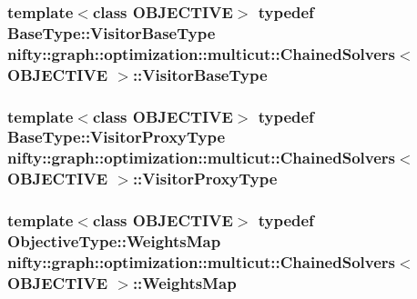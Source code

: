 \subsubsection[{Visitor\+Base\+Type}]{\setlength{\rightskip}{0pt plus 5cm}template$<$class O\+B\+J\+E\+C\+T\+I\+V\+E$>$ typedef {\bf Base\+Type\+::\+Visitor\+Base\+Type} {\bf nifty\+::graph\+::optimization\+::multicut\+::\+Chained\+Solvers}$<$ O\+B\+J\+E\+C\+T\+I\+V\+E $>$\+::{\bf Visitor\+Base\+Type}}\label{classnifty_1_1graph_1_1optimization_1_1multicut_1_1ChainedSolvers_a73196408ad592adcb3e3a89fef73fb69}
\hypertarget{classnifty_1_1graph_1_1optimization_1_1multicut_1_1ChainedSolvers_abdaad4f08d245de900243682dd917596}{}
\subsubsection[{Visitor\+Proxy\+Type}]{\setlength{\rightskip}{0pt plus 5cm}template$<$class O\+B\+J\+E\+C\+T\+I\+V\+E$>$ typedef {\bf Base\+Type\+::\+Visitor\+Proxy\+Type} {\bf nifty\+::graph\+::optimization\+::multicut\+::\+Chained\+Solvers}$<$ O\+B\+J\+E\+C\+T\+I\+V\+E $>$\+::{\bf Visitor\+Proxy\+Type}}\label{classnifty_1_1graph_1_1optimization_1_1multicut_1_1ChainedSolvers_abdaad4f08d245de900243682dd917596}
\hypertarget{classnifty_1_1graph_1_1optimization_1_1multicut_1_1ChainedSolvers_a8eefc287a6a2bea7421b42447f1a1fdf}{}
\subsubsection[{Weights\+Map}]{\setlength{\rightskip}{0pt plus 5cm}template$<$class O\+B\+J\+E\+C\+T\+I\+V\+E$>$ typedef Objective\+Type\+::\+Weights\+Map {\bf nifty\+::graph\+::optimization\+::multicut\+::\+Chained\+Solvers}$<$ O\+B\+J\+E\+C\+T\+I\+V\+E $>$\+::{\bf Weights\+Map}}\label{classnifty_1_1graph_1_1optimization_1_1multicut_1_1ChainedSolvers_a8eefc287a6a2bea7421b42447f1a1fdf}
\hypertarget{classnifty_1_1graph_1_1optimization_1_1multicut_1_1ChainedSolvers_a5ad84ddc6fe01fbae5a52afdaa03e572}{}
